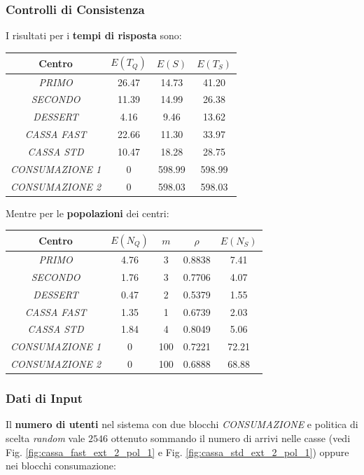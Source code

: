 \documentclass{article}
\newcommand\mP{3}
\newcommand\mS{3}
\newcommand\mD{2}
\newcommand\mF{1}
\newcommand\mC{4}
\begin{document}
\subsubsection{Controlli di Consistenza}
I risultati per i \textbf{tempi di risposta} sono:
\begin{center}
\begin{tabular}{|c|c|c|c|}
 \hline
 \textbf{Centro} & \textbf{$E(T_{Q})$} & \textbf{$E(S)$} & \textbf{$E(T_{S})$}\\
 \hline
 \textit{PRIMO} & 26.47 & 14.73 & 41.20 \\
 \hline
 \textit{SECONDO} & 11.39 & 14.99 & 26.38\\
 \hline
 \textit{DESSERT} & 4.16 & 9.46 & 13.62\\
 \hline
 \textit{CASSA FAST} & 22.66 & 11.30 & 33.97\\
 \hline
 \textit{CASSA STD} & 10.47 & 18.28 & 28.75\\
 \hline
 \textit{CONSUMAZIONE 1} & 0 & 598.99 & 598.99\\
 \hline
 \textit{CONSUMAZIONE 2} & 0 & 598.03 & 598.03\\
 \hline
\end{tabular}
\end{center}
Mentre per le \textbf{popolazioni} dei centri:
\begin{center}
\begin{tabular}{|c|c|c|c|c|}
 \hline
 \textbf{Centro} & $E(N_{Q})$ & $m$ & $\rho$ & $E(N_{S})$\\
 \hline
 \textit{PRIMO} & 4.76 & \mP & 0.8838 & 7.41\\
 \hline
 \textit{SECONDO} & 1.76 & \mS & 0.7706 & 4.07\\
 \hline
 \textit{DESSERT} & 0.47 & \mD & 0.5379 & 1.55\\
 \hline
 \textit{CASSA FAST} & 1.35 & \mF & 0.6739 & 2.03\\
 \hline
 \textit{CASSA STD} & 1.84 & \mC & 0.8049 & 5.06\\
 \hline
 \textit{CONSUMAZIONE 1} & 0 & 100 & 0.7221 & 72.21\\
 \hline
 \textit{CONSUMAZIONE 2} & 0 & 100 & 0.6888 & 68.88\\
 \hline
\end{tabular}
\end{center}

\subsubsection{Dati di Input}
Il \textbf{numero di utenti}  nel sistema con due blocchi \textit{CONSUMAZIONE} e politica di scelta \textit{random} vale $2546$ ottenuto sommando il numero di arrivi nelle casse (vedi Fig. \ref{fig:cassa_fast_ext_2_pol_1} e Fig. \ref{fig:cassa_std_ext_2_pol_1}) oppure nei blocchi consumazione:
\end{document}
